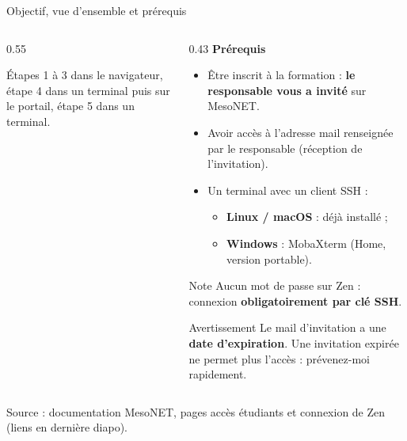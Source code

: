 \documentclass[8pt,aspectratio=169]{beamer}
\newcommand{\src}[1]{\vfill{\tiny\color{gray}Source : #1\par}}
\begin{document}
\begin{frame}{Objectif, vue d'ensemble et prérequis}
\begin{columns}[T]
\begin{column}{0.55\textwidth}
\raggedright\smallskip
Étapes 1 à 3 dans le navigateur, étape 4 dans un terminal puis sur le portail, étape 5 dans un terminal.
\end{column}
\begin{column}{0.43\textwidth}
\textbf{Prérequis}
\begin{itemize}
\item Être inscrit à la formation : \textbf{le responsable vous a invité} sur MesoNET.
\item Avoir accès à l'adresse mail renseignée par le responsable (réception de l'invitation).
\item Un terminal avec un client SSH :
 \begin{itemize}
 \item \textbf{Linux / macOS} : déjà installé ;
 \item \textbf{Windows} : MobaXterm (Home, version portable).
 \end{itemize}
\end{itemize}
\begin{block}{Note}
Aucun mot de passe sur Zen : connexion \textbf{obligatoirement par clé SSH}.
\end{block}
\begin{alertblock}{Avertissement}
Le mail d'invitation a une \textbf{date d'expiration}. Une invitation expirée ne permet plus l'accès : prévenez-moi rapidement.
\end{alertblock}
\end{column}
\end{columns}
\src{documentation MesoNET, pages \og accès étudiants \fg{} et \og connexion \fg{} de Zen (liens en dernière diapo).}
\end{frame}
\end{document}

